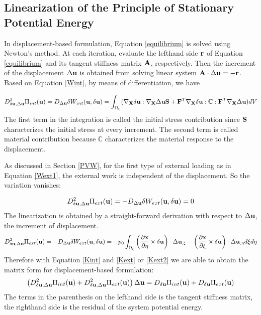%
\subsection{Linearization of the Principle of Stationary Potential Energy}
In displacement-based formulation, Equation \ref{equilibrium} is solved using Newton's method. At each iteration, evaluate the lefthand side $\bold{r}$ of Equation \ref{equilibrium} and its tangent stiffness matrix $\bold{A}$, respectively. Then the increment of the displacement $\Delta\bold{u}$ is obtained from solving linear system $\bold{A} \cdot \Delta\bold{u} = -\bold{r}$. Based on Equation \ref{Wint}, by means of differentiation, we have

\begin{equation} \label{Kint}
D^2_{\delta\bold{u}, \Delta\bold{u}}\Pi_{int}(\bold{u}) = D_{\Delta{\bold{u}}}\delta{W_{int}}(\bold{u}, \delta{\bold{u}}) = \int_{\Omega_0}(\nabla_{\bold{X}}\delta\bold{u} : \nabla_{\bold{X}}\Delta\bold{u}\bold{S} + \bold{F}^T\nabla_{\bold{X}}\delta{\bold{u}} : \mathbb{C} : \bold{F}^T \nabla_{\bold{X}}\Delta\bold{u})dV
\end{equation}
The first term in the integration is called the initial stress contribution since $\bold{S}$ characterizes the initial stress at every increment. The second term is called material contribution because $\mathbb{C}$ characterizes the material response to the displacement.

As discussed in Section \ref{PVW}, for the first type of external loading as in Equation \ref{Wext1}, the external work is independent of the displacement. So the variation vanishes:

\begin{equation} \label{Kext}
D^2_{\delta\bold{u}, \Delta\bold{u}}\Pi_{ext}(\bold{u}) = - D_{\Delta{\bold{u}}}\delta{W_{ext}}(\bold{u}, \delta{\bold{u}}) = 0
\end{equation}
The linearization is obtained by a straight-forward derivation with respect to $\Delta\bold{u}$, the increment of displacement. 
\begin{equation}  \label{Kext2}
D^2_{\delta\bold{u}, \Delta\bold{u}}\Pi_{ext}(\bold{u}) = - D_{\Delta{\bold{u}}}\delta{W_{ext}}(\bold{u}, \delta{\bold{u}}) = - p_0\int_{\Omega_{\xi}}  \left(\frac{\partial{\bold{x}}}{\partial{\eta}} \times \delta\bold{u}\right) \cdot\Delta{\bold{u}}_{,\xi} - 
\left(\frac{\partial{\bold{x}}}{\partial{\xi}} \times \delta\bold{u}\right) \cdot\Delta{\bold{u}}_{,\eta} d\xi{d\eta}
\end{equation}
Therefore with Equation \ref{Kint} and \ref{Kext} or \ref{Kext2} we are able to obtain the matrix form for displacement-based formulation:
\begin{equation} \label{matrix}
\left( D^2_{\delta\bold{u}, \Delta\bold{u}}\Pi_{int}(\bold{u}) + D^2_{\delta\bold{u}, \Delta\bold{u}}\Pi_{ext}(\bold{u})  \right) \Delta\bold{u} = D_{\delta\bold{u}}\Pi_{int}(\bold{u}) + D_{\delta\bold{u}}\Pi_{ext}(\bold{u})
\end{equation}
The terms in the parenthesis on the lefthand side is the tangent stiffness matrix, the righthand side is the residual of the system potential energy.

